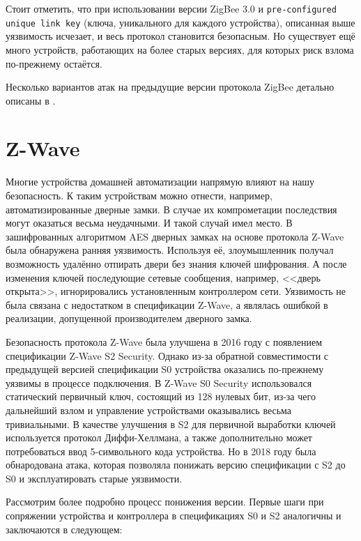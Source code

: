 	Стоит отметить, что при использовании версии ZigBee 3.0 и \texttt{pre-configured unique link key} (ключа,
	уникального для каждого устройства), описанная выше уязвимость исчезает, и весь протокол
	становится безопасным. Но существует ещё много устройств, работающих на более старых версиях,
	для которых риск взлома по-прежнему остаётся.
	
	Несколько вариантов атак на предыдущие версии протокола ZigBee детально описаны в 
	\cite{zigbee-attacks}.


	\section{Z-Wave}
	
	
	Многие устройства домашней автоматизации напрямую влияют на
	нашу безопасность. К таким устройствам можно отнести, например, автоматизированные дверные замки.
	В случае их компрометации последствия могут оказаться весьма неудачными. И такой случай
	имел место. В зашифрованных алгоритмом AES дверных замках на основе протокола Z-Wave была 
	обнаружена ранняя уязвимость. Используя её, злоумышленник получал возможность удалённо отпирать 
	двери без знания ключей шифрования. А после изменения ключей последующие сетевые сообщения, 
	например, <<дверь открыта>>, игнорировались установленным контроллером сети.
	Уязвимость не была связана с недостатком в спецификации Z-Wave, а являлась ошибкой 
	в реализации, допущенной производителем дверного замка.
	
	Безопасность протокола Z-Wave была улучшена в 2016 году с появлением спецификации Z-Wave S2 
	Security. Однако из-за обратной совместимости с предыдущей версией спецификации S0 устройства
	оказались по-прежнему уязвимы в процессе подключения. В Z-Wave S0 Security использовался статический
	первичный ключ, состоящий из 128 нулевых бит, из-за чего дальнейший взлом и управление устройствами 
	оказывались весьма тривиальными. В качестве улучшения в S2 для первичной выработки ключей 
	используется протокол Диффи-Хеллмана, а также дополнительно может потребоваться ввод 5-символьного
	кода устройства. Но в 2018 году была обнародована атака, которая позволяла понижать версию 
	спецификации с S2 до S0 и эксплуатировать старые уязвимости.
	
	
	Рассмотрим более подробно процесс понижения версии. Первые шаги при сопряжении устройства и 
	контроллера в спецификациях S0 и S2 аналогичны и заключаются в следующем:
	

